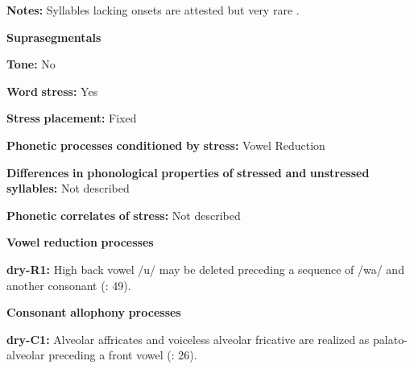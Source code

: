 \begin{styleBody}
\textbf{Notes:} Syllables lacking onsets are attested but very rare \citep[19]{Dhakal2012}.
\end{styleBody}

\begin{styleBody}
\textbf{Suprasegmentals}
\end{styleBody}

\begin{styleBody}
\textbf{Tone:} No
\end{styleBody}

\begin{styleBody}
\textbf{Word} \textbf{stress:} Yes
\end{styleBody}

\begin{styleBody}
\textbf{Stress} \textbf{placement:} Fixed
\end{styleBody}

\begin{styleBody}
\textbf{Phonetic} \textbf{processes} \textbf{conditioned} \textbf{by} \textbf{stress:} Vowel Reduction
\end{styleBody}

\begin{styleBody}
\textbf{Differences} \textbf{in} \textbf{phonological} \textbf{properties} \textbf{of} \textbf{stressed} \textbf{and} \textbf{unstressed} \textbf{syllables:} Not described
\end{styleBody}

\begin{styleBody}
\textbf{Phonetic} \textbf{correlates} \textbf{of} \textbf{stress:} Not described
\end{styleBody}

\begin{styleBody}
\textbf{Vowel} \textbf{reduction} \textbf{processes}
\end{styleBody}

\begin{styleBody}
\textbf{dry-R1:} High back vowel /u/ may be deleted preceding a sequence of /wa/ and another consonant (\citealt{KotapishKotapish1973}: 49).
\end{styleBody}

\begin{styleBody}
\textbf{Consonant} \textbf{allophony} \textbf{processes}
\end{styleBody}

\begin{styleBody}
\textbf{dry-C1:} Alveolar affricates and voiceless alveolar fricative are realized as palato-alveolar preceding a front vowel (\citealt{KotapishKotapish1978}: 26).
\end{styleBody}

